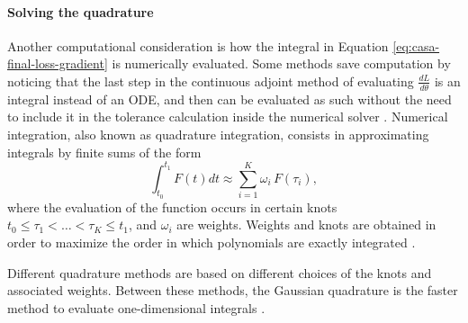 \paragraph{Solving the quadrature}

Another computational consideration is how the integral in Equation \eqref{eq:casa-final-loss-gradient} is numerically evaluated. 
Some methods save computation by noticing that the last step in the continuous adjoint method of evaluating $\frac{dL}{d\theta}$ is an integral instead of an ODE, and then can be evaluated as such without the need to include it in the tolerance calculation inside the numerical solver \cite{that-is-not-an-ode}.
Numerical integration, also known as quadrature integration, consists in approximating integrals by finite sums of the form
\begin{equation}
    \int_{t_0}^{t_1} 
    F(t) dt
    \approx
    \sum_{i=1}^K \omega_i \, F(\tau_i),
\end{equation}
where the evaluation of the function occurs in certain knots $t_0 \leq \tau_1 < \ldots < \tau_K \leq t_1$, and $\omega_i$ are weights. 
Weights and knots are obtained in order to maximize the order in which polynomials are exactly integrated \cite{stoer2002-numerical}. 

Different quadrature methods are based on different choices of the knots and associated weights.
Between these methods, the Gaussian quadrature is the faster method to evaluate one-dimensional integrals \cite{Norcliffe_gaussquadrature_2023}.

